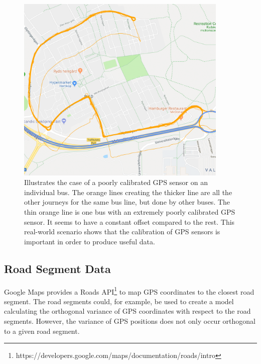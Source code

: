 \begin{figure}[ht!]
    \centering
    \includegraphics[width=0.9\textwidth]{figures/gps_sensor_calibration}
    \caption{Illustrates the case of a poorly calibrated GPS sensor on an individual bus.
    The orange lines creating the thicker line are all the other journeys for the same bus line, but done by other buses.
    The thin orange line is one bus with an extremely poorly calibrated GPS sensor.
    It seems to have a constant offset compared to the rest.
    This real-world scenario shows that the calibration of GPS sensors is important in order to produce useful data.}
    \label{fig:gps-sensor-calibration}
\end{figure}

\subsection{Road Segment Data}
Google Maps provides a Roads API\footnote{https://developers.google.com/maps/documentation/roads/intro} to map GPS coordinates to the closest road segment.
The road segments could, for example, be used to create a model calculating the orthogonal variance of GPS coordinates with respect to the road segments.
However, the variance of GPS positions does not only occur orthogonal to a given road segment.  

